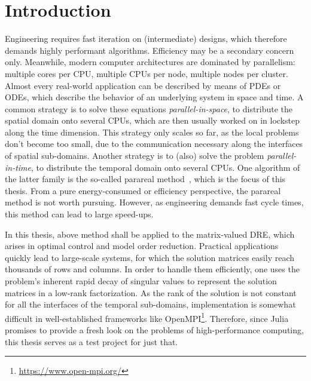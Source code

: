 \chapter{Introduction}

Engineering requires fast iteration on (intermediate) designs,
which therefore demands highly performant algorithms.
Efficiency may be a secondary concern only.
Meanwhile, modern computer architectures are dominated by parallelism:
multiple cores per CPU,
multiple CPUs per node,
multiple nodes per cluster.
Almost every real-world application can be described by means of \acp{PDE} or \acp{ODE},
which describe the behavior of an underlying system in space and time.
A common strategy is to solve these equations \emph{parallel-in-space},
\ie to distribute the spatial domain onto several CPUs,
which are then usually worked on in lockstep along the time dimension.
This strategy only scales so far, as the local problems don't become too small,
due to the communication necessary along the interfaces of spatial sub-domains.
Another strategy is to (also) solve the problem \emph{parallel-in-time},
\ie to distribute the temporal domain onto several CPUs.
One algorithm of the latter family is the so-called parareal method~\cite{Lions2001},
which is the focus of this thesis.
From a pure energy-consumed or efficiency perspective,
the parareal method is not worth pursuing.
However, as engineering demands fast cycle times,
this method can lead to large speed-ups.

In this thesis, above method shall be applied to the matrix-valued \ac{DRE},
which arises \eg in optimal control and model order reduction.
Practical applications quickly lead to large-scale systems,
for which the solution matrices easily reach thousands of rows and columns.
In order to handle them efficiently,
one uses the problem's inherent rapid decay of singular values
to represent the solution matrices in a low-rank factorization.
As the rank of the solution is not constant for all the interfaces of the temporal sub-domains,
implementation is somewhat difficult in well-established frameworks like OpenMPI\footnote{%
  \url{https://www.open-mpi.org/}
}.
Therefore, since Julia~\cite{Julia} promises to provide a fresh look on the problems of high-performance computing,
this thesis serves as a test project for just that.

